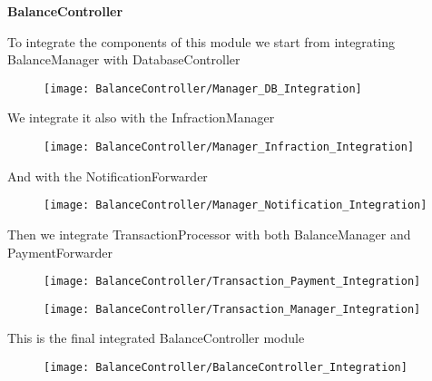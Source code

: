 \textbf{BalanceController}

To integrate the components of this module we start from integrating BalanceManager with DatabaseController
\begin{figure}[H]
\centering
\texttt{[image: BalanceController/Manager\_DB\_Integration]}
\end{figure}

We integrate it also with the InfractionManager
\begin{figure}[H]
\centering
\texttt{[image: BalanceController/Manager\_Infraction\_Integration]}
\end{figure}

And with the NotificationForwarder
\begin{figure}[H]
\centering
\texttt{[image: BalanceController/Manager\_Notification\_Integration]}
\end{figure}

Then we integrate TransactionProcessor with both BalanceManager and PaymentForwarder
\begin{figure}[H]
\centering
\texttt{[image: BalanceController/Transaction\_Payment\_Integration]}
\end{figure}

\begin{figure}[H]
\centering
\texttt{[image: BalanceController/Transaction\_Manager\_Integration]}
\end{figure}

This is the final integrated BalanceController module
\begin{figure}[H]
\centering
\texttt{[image: BalanceController/BalanceController\_Integration]}
\end{figure}